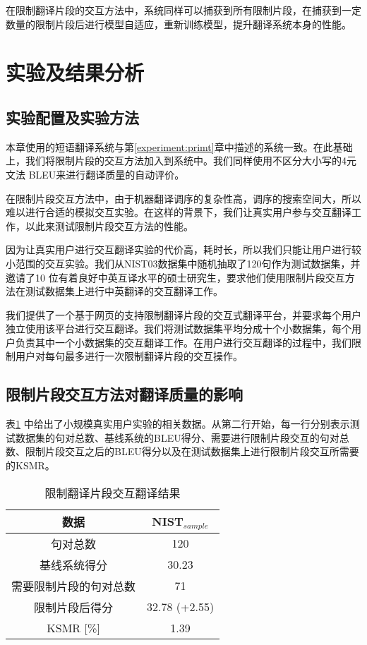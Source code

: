\documentclass[master, winfont]{njuthesis}
\begin{document}
在限制翻译片段的交互方法中，系统同样可以捕获到所有限制片段，在捕获到一定数量的限制片段后进行模型自适应，重新训练模型，提升翻译系统本身的性能。

\section{实验及结果分析}
\subsection{实验配置及实验方法}
本章使用的短语翻译系统与第\ref{experiment:primt}章中描述的系统一致。在此基础上，我们将限制片段的交互方法加入到系统中。我们同样使用不区分大小写的4元文法 BLEU来进行翻译质量的自动评价。

在限制片段交互方法中，由于机器翻译调序的复杂性高，调序的搜索空间大，所以难以进行合适的模拟交互实验。在这样的背景下，我们让真实用户参与交互翻译工作，以此来测试限制片段交互方法的性能。

因为让真实用户进行交互翻译实验的代价高，耗时长，所以我们只能让用户进行较小范围的交互实验。我们从NIST03数据集中随机抽取了120句作为测试数据集，并邀请了10 位有着良好中英互译水平的硕士研究生，要求他们使用限制片段交互方法在测试数据集上进行中英翻译的交互翻译工作。

我们提供了一个基于网页的支持限制翻译片段的交互式翻译平台，并要求每个用户独立使用该平台进行交互翻译。我们将测试数据集平均分成十个小数据集，每个用户负责其中一个小数据集的交互翻译工作。在用户进行交互翻译的过程中，我们限制用户对每句最多进行一次限制翻译片段的交互操作。
\subsection{限制片段交互方法对翻译质量的影响}
表\ref{table:span} 中给出了小规模真实用户实验的相关数据。从第二行开始，每一行分别表示测试数据集的句对总数、基线系统的BLEU得分、需要进行限制片段交互的句对总数、限制片段交互之后的BLEU得分以及在测试数据集上进行限制片段交互所需要的KSMR。

\begin{table}[!htb]
\begin{center}
\begin{tabular}{c|c}
\hline
数据 & NIST$_{sample}$ \\
\hline
句对总数 & 120 \\
\hline
基线系统得分 & 30.23 \\
\hline
需要限制片段的句对总数 & 71 \\
\hline
限制片段后得分 & 32.78 (+2.55)\\
\hline
KSMR [\%] & 1.39\\
\hline
\end{tabular}
\end{center}
\caption{\label{table:span} 限制翻译片段交互翻译结果}
\end{table}
\end{document}
